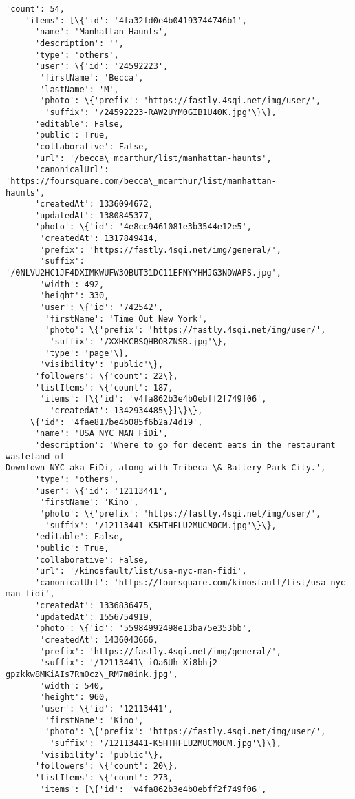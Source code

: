 \documentclass[11pt]{article}
\begin{document}
\begin{tcolorbox}[breakable, size=fbox, boxrule=.5pt, pad at break*=1mm, opacityfill=0]
\begin{Verbatim}[commandchars=\\\{\}]
    'count': 54,
    'items': [\{'id': '4fa32fd0e4b04193744746b1',
      'name': 'Manhattan Haunts',
      'description': '',
      'type': 'others',
      'user': \{'id': '24592223',
       'firstName': 'Becca',
       'lastName': 'M',
       'photo': \{'prefix': 'https://fastly.4sqi.net/img/user/',
        'suffix': '/24592223-RAW2UYM0GIB1U40K.jpg'\}\},
      'editable': False,
      'public': True,
      'collaborative': False,
      'url': '/becca\_mcarthur/list/manhattan-haunts',
      'canonicalUrl': 'https://foursquare.com/becca\_mcarthur/list/manhattan-
haunts',
      'createdAt': 1336094672,
      'updatedAt': 1380845377,
      'photo': \{'id': '4e8cc9461081e3b3544e12e5',
       'createdAt': 1317849414,
       'prefix': 'https://fastly.4sqi.net/img/general/',
       'suffix': '/0NLVU2HC1JF4DXIMKWUFW3QBUT31DC11EFNYYHMJG3NDWAPS.jpg',
       'width': 492,
       'height': 330,
       'user': \{'id': '742542',
        'firstName': 'Time Out New York',
        'photo': \{'prefix': 'https://fastly.4sqi.net/img/user/',
         'suffix': '/XXHKCBSQHBORZNSR.jpg'\},
        'type': 'page'\},
       'visibility': 'public'\},
      'followers': \{'count': 22\},
      'listItems': \{'count': 187,
       'items': [\{'id': 'v4fa862b3e4b0ebff2f749f06',
         'createdAt': 1342934485\}]\}\},
     \{'id': '4fae817be4b085f6b2a74d19',
      'name': 'USA NYC MAN FiDi',
      'description': 'Where to go for decent eats in the restaurant wasteland of
Downtown NYC aka FiDi, along with Tribeca \& Battery Park City.',
      'type': 'others',
      'user': \{'id': '12113441',
       'firstName': 'Kino',
       'photo': \{'prefix': 'https://fastly.4sqi.net/img/user/',
        'suffix': '/12113441-K5HTHFLU2MUCM0CM.jpg'\}\},
      'editable': False,
      'public': True,
      'collaborative': False,
      'url': '/kinosfault/list/usa-nyc-man-fidi',
      'canonicalUrl': 'https://foursquare.com/kinosfault/list/usa-nyc-man-fidi',
      'createdAt': 1336836475,
      'updatedAt': 1556754919,
      'photo': \{'id': '55984992498e13ba75e353bb',
       'createdAt': 1436043666,
       'prefix': 'https://fastly.4sqi.net/img/general/',
       'suffix': '/12113441\_iOa6Uh-Xi8bhj2-gpzkkw8MKiAIs7RmOcz\_RM7m8ink.jpg',
       'width': 540,
       'height': 960,
       'user': \{'id': '12113441',
        'firstName': 'Kino',
        'photo': \{'prefix': 'https://fastly.4sqi.net/img/user/',
         'suffix': '/12113441-K5HTHFLU2MUCM0CM.jpg'\}\},
       'visibility': 'public'\},
      'followers': \{'count': 20\},
      'listItems': \{'count': 273,
       'items': [\{'id': 'v4fa862b3e4b0ebff2f749f06',

\end{Verbatim}
\end{tcolorbox}
\end{document}
